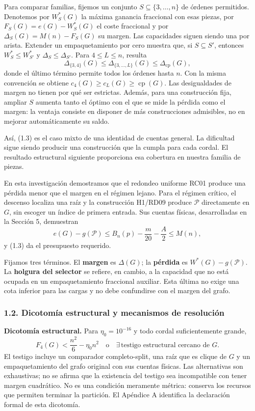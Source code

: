\documentclass[spanish,11pt,a4paper]{article}
\begin{document}
Para comparar familias, fijemos un conjunto \(S\subseteq\{3,\ldots,n\}\) de órdenes permitidos. Denotemos por \(W_S^*(G)\) la máxima ganancia fraccional con esas piezas, por \(F_S(G)=e(G)-W_S^*(G)\) el coste fraccional y por \(\Delta_S(G)=M(n)-F_S(G)\) su margen. Las capacidades siguen siendo una por arista. Extender un empaquetamiento por cero muestra que, si \(S\subseteq S'\), entonces \(W_S^*\le W_{S'}^*\) y \(\Delta_S\le\Delta_{S'}\). Para \(4\le L\le n\), resulta \[
\Delta_{\{3,4\}}(G)\le\Delta_{\{3,\ldots,L\}}(G)
\le\Delta_{\mathrm{cp}}(G),
\tag{1.3b}
\] donde el último término permite todos los órdenes hasta \(n\). Con la misma convención se obtiene \(c_4(G)\ge c_L(G)\ge\operatorname{cp}(G)\). Las desigualdades de margen no tienen por qué ser estrictas. Además, para una construcción fija, ampliar \(S\) aumenta tanto el óptimo con el que se mide la pérdida como el margen: la ventaja consiste en disponer de más construcciones admisibles, no en mejorar automáticamente su saldo.

Así, (1.3) es el caso mixto de una identidad de cuentas general. La dificultad sigue siendo producir una construcción que la cumpla para cada cordal. El resultado estructural siguiente proporciona esa cobertura en nuestra familia de piezas.

En esta investigación demostramos que el redondeo uniforme RC01 produce una pérdida menor que el margen en el régimen lejano. Para el régimen crítico, el descenso localiza una raíz y la construcción H1/RD09 produce \(\mathcal P\) directamente en \(G\), sin escoger un índice de primera entrada. Sus cuentas físicas, desarrolladas en la Sección 5, demuestran \[
e(G)-g(\mathcal P)
\le B_n(p)-\frac m{20}-\frac A2
\le M(n),
\tag{1.4}
\] y (1.3) da el presupuesto requerido.

Fijamos tres términos. El \textbf{margen} es \(\Delta(G)\); la \textbf{pérdida} es \(W^*(G)-g(\mathcal P)\). La \textbf{holgura del selector} se refiere, en cambio, a la capacidad que no está ocupada en un empaquetamiento fraccional auxiliar. Esta última no exige una cota inferior para las cargas y no debe confundirse con el margen del grafo.

\subsubsection{1.2. Dicotomía estructural y mecanismos de resolución}\label{dicotomia-estructural-y-mecanismos-de-resolucion}

\textbf{Dicotomía estructural.} Para \(\eta_0=10^{-16}\) y todo cordal suficientemente grande, \[
\boxed{
F_4(G)<\frac{n^2}{6}-\eta_0n^2
\quad\text{o}\quad
\exists\,\text{testigo estructural cercano de }G.
}
\tag{1.5}
\] El testigo incluye un comparador completo-split, una raíz que es clique de \(G\) y un empaquetamiento del grafo original con sus cuentas físicas. Las alternativas son exhaustivas; no se afirma que la existencia del testigo sea incompatible con tener margen cuadrático. No es una condición meramente métrica: conserva los recursos que permiten terminar la partición. El Apéndice A identifica la declaración formal de esta dicotomía.
\end{document}
